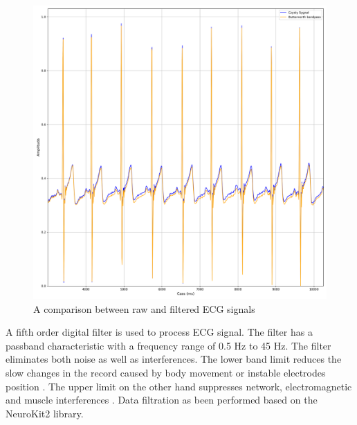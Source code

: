 \documentclass[journal]{IEEEtran}
\begin{document}
{\begin{figure}[htbp]
    \centering
    \includegraphics[width=0.76\linewidth]{Filtr_EKG.png} 
    \caption{A comparison between raw and filtered ECG signals}
    \label{fig:filtr_ekg}
\end{figure}

A fifth order digital filter is used to process ECG signal. The filter has a passband characteristic with a frequency range of 0.5 Hz to 45 Hz. The filter eliminates both noise as well as interferences. The lower band limit reduces the slow changes in the record caused by body movement or instable electrodes position \cite{24}. The upper limit on the other hand suppresses network, electromagnetic and muscle interferences \cite{25}. Data filtration as been performed based on the NeuroKit2 library.


}
\end{document}
